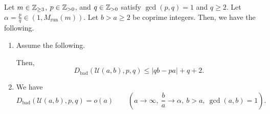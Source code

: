 \begin{lemma}\label{lem:bad-factors}
Let $m\in\mathbb Z_{\ge3}$, $p\in\mathbb Z_{>0}$, and $q\in\mathbb Z_{>0}$ satisfy $\gcd(p,q)=1$ and $q\ge2$.
Let $\alpha=\frac pq\in(1,M_{\mathrm{run}}(m))$.
Let $b>a\ge2$ be coprime integers.
Then, we have the following.
\begin{enumerate}
\item\label{c:bad-factors-bound} Assume the following.
Then,
\begin{equation}\label{eq:bad-windows}
 D_{\mathrm{bad}}(\mathcal U(a,b),p,q)\le |qb-pa|+q+2.
\end{equation}
\item\label{c:bad-factors-negligible} We have
\[
 D_{\mathrm{bad}}(\mathcal U(a,b),p,q)=o(a)
 \qquad\left(a\to\infty,\ \frac ba\to\alpha,\ b>a,\ \gcd(a,b)=1\right).
\]
\end{enumerate}
\end{lemma}
